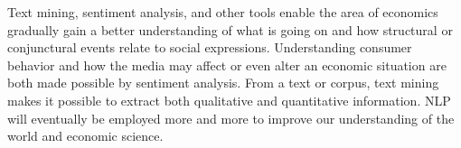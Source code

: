Text mining, sentiment analysis, and other tools enable the area of economics gradually gain a better understanding of what is going on and how structural or conjunctural events relate to social expressions. Understanding consumer behavior and how the media may affect or even alter an economic situation are both made possible by sentiment analysis. From a text or corpus, text mining makes it possible to extract both qualitative and quantitative information. NLP will eventually be employed more and more to improve our understanding of the world and economic science.\\


%

















